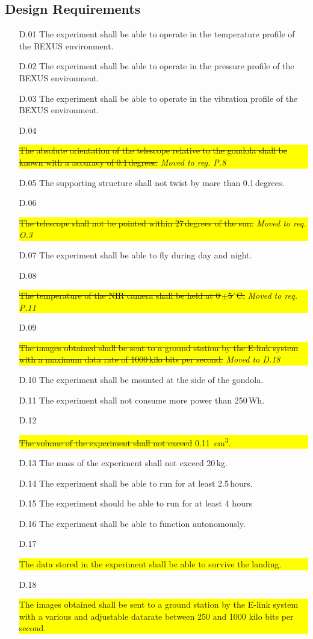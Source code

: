 \subsection{Design Requirements}

\begin{enumerate}[topsep=0pt,itemsep=-1ex,partopsep=1ex,parsep=1ex]
	\item[D.01] The experiment shall be able to operate in the temperature profile of the BEXUS environment.
	\item[D.02] The experiment shall be able to operate in the pressure profile of the BEXUS environment.
    \item[D.03] The experiment shall be able to operate in the vibration profile of the BEXUS environment.
    \item[D.04] \colorbox{yellow}{\parbox{\textwidth}{\st{The absolute orientation of the telescope relative to the gondola shall be known with a accuracy of 0.1\,degrees.} \textit{Moved to reg. P.8}}}
	\item[D.05] The supporting structure shall not twist by more than 0.1\,degrees.
	\item[D.06] \colorbox{yellow}{\parbox{\textwidth}{\st{The telescope shall not be pointed within 27\,degrees of the sun.} \textit{Moved to req. O.3}}}
	\item[D.07] The experiment shall be able to fly during day and night.
	\item[D.08] \colorbox{yellow}{\parbox{\textwidth}{\st{The temperature of the NIR camera shall be held at 0\,$\pm$5\,$^\circ$C.} \textit{Moved to req. P.11}}}
	\item[D.09] \colorbox{yellow}{\parbox{\textwidth}{\st{The images obtained shall be sent to a ground station by the E-link system with a maximum data rate of 1000\,kilo bits per second.} \textit{Moved to D.18}}}
	\item[D.10] The experiment shall be mounted at the side of the gondola.
	\item[D.11] The experiment shall not consume more power than 250\,Wh.
    \item[D.12] \colorbox{yellow}{\parbox{\textwidth}{\st{The volume of the experiment shall not exceed }\SI{0.11}{cm\cubed}.}}
    \item[D.13] The mass of the experiment shall not exceed 20\,kg.
    \item[D.14] The experiment shall be able to run for at least 2.5\,hours.
    \item [D.15] The experiment should be able to run for at least 4 hours
    \item[D.16] The experiment shall be able to function autonomously.
    \item[D.17] \colorbox{yellow}{\parbox{\textwidth}{The data stored in the experiment shall be able to survive the landing.}}
    \item[D.18] \colorbox{yellow}{\parbox{\textwidth}{The images obtained shall be sent to a ground station by the E-link system with a various and adjustable datarate between 250 and 1000 kilo bits per second.}}
\end{enumerate}
